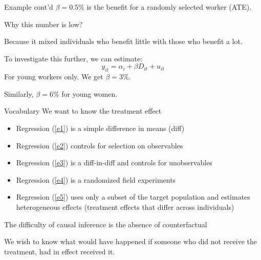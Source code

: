 \documentclass[handout]{beamer}
\begin{document}
\begin{frame}{Example cont'd}
$\beta=0.5\%$ is the benefit for a randomly selected worker (ATE).\bigskip

Why this number is low?\medskip\pause

Because it mixed individuals who benefit little with those who benefit a lot.\bigskip

To investigate this further, we can estimate:
\begin{equation}\label{e5}
y_{it}=\alpha_i+\beta D_{it} +u_{it}
\end{equation}
For young workers only. We get $\beta=3\%$.\medskip

Similarly, $\beta=6\%$ for young women.
\end{frame}

\begin{frame}{Vocabulary}
We want to know the treatment effect
\begin{itemize}
\item Regression (\ref{e1}) is a simple difference in means (diff)
\item Regression (\ref{e2}) controls for selection on observables
\item Regression (\ref{e3}) is a diff-in-diff and controls for unobservables
\item Regression (\ref{e4}) is a randomized field experiments
\item Regression (\ref{e5}) uses only a subset of the target population and estimates heterogeneous effects (treatment effects that differ across individuals)	
\end{itemize}\medskip

The difficulty of causal inference is the absence of counterfactual\medskip


We wish to know what would have happened if someone who did not receive the treatment, had in effect received it.
\end{frame}
\end{document}
